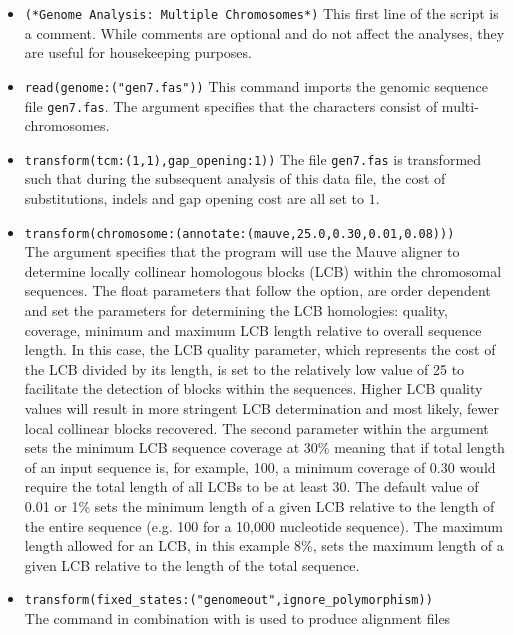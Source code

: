 \begin{itemize}
\item \texttt{(*Genome Analysis: Multiple Chromosomes*)} This first
line of the script is a comment. While comments are optional and
do not affect the analyses, they are useful for housekeeping purposes.
\item \texttt{read(genome:("gen7.fas"))} This command imports the
genomic sequence file \texttt{gen7.fas}. The argument 
specifies that the characters consist of multi-chromosomes.  
\item \texttt{transform(tcm:(1,1),gap\_opening:1))} The file \texttt{gen7.fas}
is transformed such that during the subsequent analysis of this
data file, the cost of substitutions, indels and gap opening cost
are all set to $1$.  
\item \texttt{transform(chromosome:(annotate:(mauve,25.0,0.30,0.01,0.08)))} \\The
argument  specifies that the program
will use the Mauve aligner \cite{darlingetal2004} to determine
locally collinear homologous blocks (LCB) within the chromosomal
sequences.  The float parameters that follow the 
option, are order dependent and set the parameters for determining
the LCB homologies: quality, coverage, minimum and maximum LCB
length relative to overall sequence length. In this case, the LCB
quality parameter, which represents the cost of the LCB divided by
its length,  is set to the relatively low value of 25 to facilitate the detection
 of blocks within the sequences.  Higher LCB quality values will
 result in more stringent LCB determination and most likely, fewer
 local collinear blocks recovered.  The second parameter within the
 argument  sets the minimum LCB
 sequence coverage at  30\% meaning that if total length of an input
 sequence is, for example, 100, a minimum coverage of 0.30 would
 require  the total length of all LCBs to be at least 30. The default
 value of 0.01 or 1\% sets the minimum length of a given LCB  relative
 to the length of the entire sequence (e.g. 100 for a 10,000
 nucleotide sequence). The maximum length allowed for an LCB, in
 this example 8\%, sets the maximum length of a given LCB relative
 to the length of the total sequence.
\item \texttt{transform(fixed\_states:("genomeout",ignore\_polymorphism))}\\
The  command in combination with
 is used to produce alignment files

\end{itemize}
